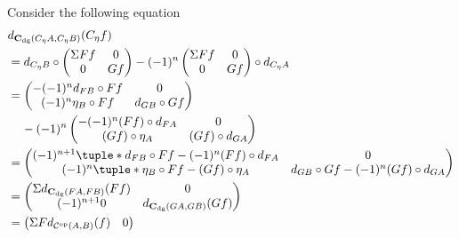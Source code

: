 \begin{remark}
\begin{itemize}
{            Consider the following equation
            \begin{align*}
                &d_{\C_{\dg}(C_{\eta} A, C_{\eta} B)}(C_{\eta} f) \\
                &= d_{C_{\eta} B} \circ
                \begin{pmatrix}
                    \Sigma F f & 0 \\
                    0 & G f
                \end{pmatrix}
                - (-1)^n
                \begin{pmatrix}
                    \Sigma F f & 0 \\
                    0 & G f
                \end{pmatrix}
                \circ d_{C_{\eta} A} \\
                &=
                \begin{pmatrix}
                    -(-1)^n d_{F B} \circ F f & 0 \\
                    (-1)^n \eta_B \circ F f & d_{G B} \circ G f
                \end{pmatrix} \\
                &\hspace{0.4cm} - (-1)^n
                \begin{pmatrix}
                    -(-1)^n (F f) \circ d_{F A} & 0 \\
                    (G f) \circ \eta_A & (G f) \circ d_{G A}
                \end{pmatrix} \\
                &=
                \begin{pmatrix}
                    (-1)^{n + 1}\tuple*{d_{F B} \circ F f - (-1)^n (F f) \circ d_{F A}} & 0 \\
                    (-1)^n\tuple*{\eta_B \circ F f - (G f) \circ \eta_A} & d_{G B} \circ G f - (-1)^n (G f) \circ d_{G A}
                \end{pmatrix} \\
                &=
                \begin{pmatrix}
                    \Sigma d_{\C_{\dg}(F A, F B)}(F f) & 0 \\
                    (-1)^{n + 1} 0 & d_{\C_{\dg}(G A, G B)}(G f)
                \end{pmatrix} \\
                &=
                \begin{pmatrix}
                    \Sigma F d_{\Cc^{\op}(A, B)}(f) & 0 \\

\end{pmatrix}
\end{align*}}
\end{itemize}
\end{remark}
